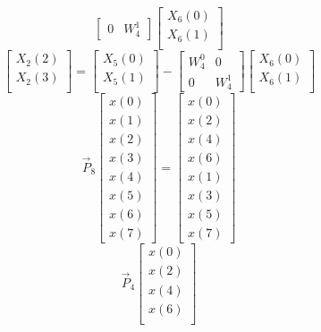 \documentclass[journal,12pt,twocolumn]{IEEEtran}
\renewcommand\thesection{\arabic{section}}
\begin{document}
\begin{enumerate}[label=\thesection.\arabic*]
\begin{equation}
\begin{bmatrix}
0 & W^{1}_{4}
\end{bmatrix}
\begin{bmatrix}
X_{6}(0) \\ 
X_{6}(1) \\ 
\end{bmatrix}
\end{equation}
\begin{equation}
\begin{bmatrix}
X_{2}(2) \\ 
X_{2}(3)\\ 
\end{bmatrix}
=
\begin{bmatrix}
X_{5}(0) \\ 
X_{5}(1)\\ 
\end{bmatrix}
-
\begin{bmatrix}
W^{0}_{4} & 0\\
0 & W^{1}_{4}
\end{bmatrix}
\begin{bmatrix}
X_{6}(0) \\ 
X_{6}(1) \\ 
\end{bmatrix}
\end{equation}
\begin{equation}
\vec{P}_{8}
\begin{bmatrix}
x(0) \\ 
x(1) \\ 
x(2) \\ 
x(3) \\ 
x(4) \\ 
x(5) \\
x(6) \\
x(7)
\end{bmatrix}
= 
\begin{bmatrix}
x(0) \\ 
x(2) \\ 
x(4) \\ 
x(6) \\
x(1) \\ 
x(3) \\ 
x(5) \\
x(7)
\end{bmatrix}
\end{equation}
\begin{equation}
\vec{P}_{4}
\begin{bmatrix}
x(0) \\ 
x(2) \\ 
x(4) \\ 
x(6) \\

\end{bmatrix}
\end{equation}
\end{enumerate}
\end{document}
